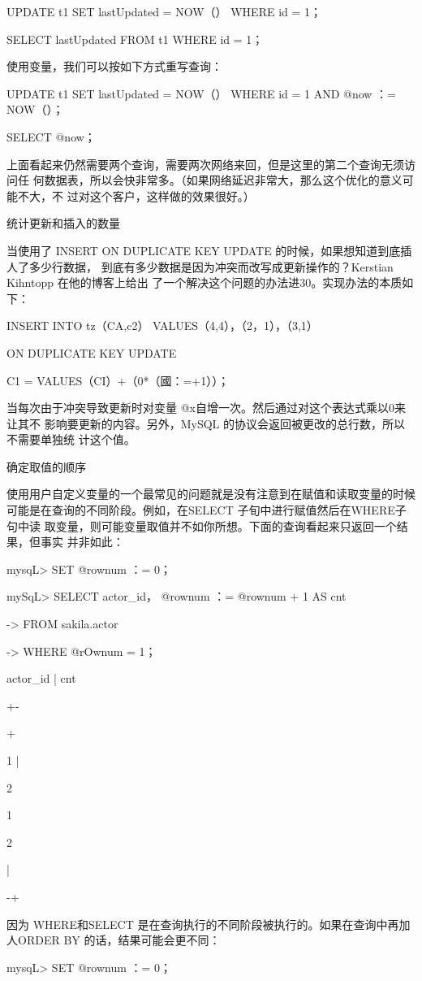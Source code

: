 UPDATE t1 SET lastUpdated = NOW（） WHERE id = 1；

SELECT lastUpdated FROM t1 WHERE id = 1；

使用变量，我们可以按如下方式重写查询：

UPDATE t1 SET lastUpdated = NOW（） WHERE id = 1 AND @now ：= NOW（）；

SELECT @now；

上面看起来仍然需要两个查询，需要两次网络来回，但是这里的第二个查询无须访问任
何数据表，所以会快非常多。（如果网络延迟非常大，那么这个优化的意义可能不大，不
过对这个客户，这样做的效果很好。）

统计更新和插入的数量

当使用了 INSERT ON DUPLICATE KEY UPDATE 的时候，如果想知道到底插人了多少行数据，
到底有多少数据是因为冲突而改写成更新操作的？Kerstian Kihntopp 在他的博客上给出
了一个解决这个问题的办法进30。实现办法的本质如下：

INSERT INTO tz（CA,c2） VALUES（4,4），（2，1），（3,1）

ON DUPLICATE KEY UPDATE

C1 = VALUES（CI）+（0*（國：=+1））；

当每次由于冲突导致更新时对变量 @x自增一次。然后通过对这个表达式乘以0来让其不
影响要更新的内容。另外，MySQL 的协议会返回被更改的总行数，所以不需要单独统
计这个值。

确定取值的顺序

使用用户自定义变量的一个最常见的问题就是没有注意到在赋值和读取变量的时候
可能是在查询的不同阶段。例如，在SELECT 子旬中进行赋值然后在WHERE子句中读
取变量，则可能变量取值并不如你所想。下面的查询看起来只返回一个结果，但事实
并非如此：

mysqL> SET @rownum ：= 0；

mySqL> SELECT actor\_id， @rownum ：= @rownum + 1 AS cnt

-> FROM sakila.actor

-> WHERE @rOwnum = 1；

actor\_id | cnt

+-

+

1 |

2

1

2

|

-+

因为 WHERE和SELECT 是在查询执行的不同阶段被执行的。如果在查询中再加人ORDER
BY 的话，结果可能会更不同：

mysqL> SET @rownum ：= 0；

